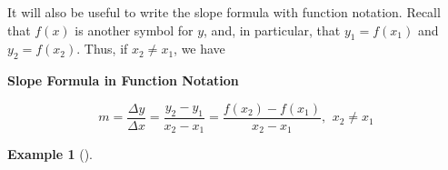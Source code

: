 \documentclass[10pt,]{book}
\theoremstyle{plain}
\theoremstyle{definition}
\theoremstyle{definition}
\newtheorem{example}[theorem]{Example}
\theoremstyle{definition}
\theoremstyle{definition}
\numberwithin{equation}{section}
\newcounter{figstack}
\newlength\fight
\newcommand\pushValignCaptionBottom[5][b]{%
\stepcounter{figstack}%
\expandafter\def\csname %
figalign\romannumeral\value{figstack}\endcsname{#1}%
\expandafter\def\csname %
figtype\romannumeral\value{figstack}\endcsname{#2}%
\expandafter\def\csname %
figwd\romannumeral\value{figstack}\endcsname{#3}%
\expandafter\def\csname %
figcontent\romannumeral\value{figstack}\endcsname{#4}%
\expandafter\def\csname %
figcap\romannumeral\value{figstack}\endcsname{#5}%
\setbox0=\hbox{%
\begin{#2}{#3}#4\end{#2}}%
\ifdim\dimexpr\ht0+\dp0\relax>\fight\global\setlength{\fight}{%
\dimexpr\ht0+\dp0\relax}\fi%
}
\begin{document}
    It will also be useful to write the slope formula with function notation. Recall that \(f (x)\) is another symbol for \(y\), and, in particular, that \(y_1 = f (x_1)\) and \(y_2 = f (x_2)\). Thus, if \(x_2 \ne x_1\), we have
%
\begin{mdframed}[style=assemblage]%
\noindent\textbf{\large Slope Formula in Function Notation}\label{assemblage-13}\par\medskip

    \begin{equation*}m = \frac{\Delta y}{\Delta x}
        = \frac{y_2 − y_1}{x_2 − x_1} 
        = \frac{f(x_2) − f(x_1)}{x_2 − x_1} 
            \text{, }~x_2 \ne x_1\end{equation*}%
\end{mdframed}
\begin{example}[]\label{slopes-on-parabola}
\leavevmode%
\end{example}
\end{document}
